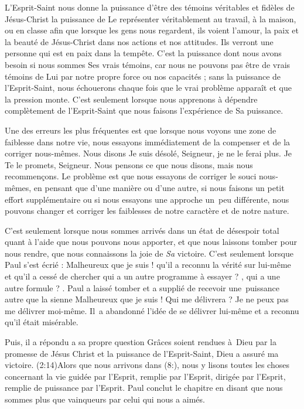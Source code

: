 L'Esprit-Saint nous donne la puissance d'être des témoins véritables
 et fidèles de Jésus-Christ \ocadr la puissance de Le représenter
 véritablement au travail, à la maison, ou en classe \fcadr{}
 afin que lorsque les gens nous regardent, ils voient l'amour,
 la paix et la beauté de Jésus-Christ dans nos actions et nos attitudes.
 Ils verront une personne qui est en paix dans la tempête.
 C'est la puissance dont nous avons besoin si nous sommes Ses vrais témoins,
 car nous ne pouvons pas être de vrais témoins de Lui par notre propre force
 ou nos capacités ; sans la puissance de l'Esprit-Saint, nous échouerons
 chaque fois que le vrai problème apparaît et que la pression monte.
 C'est seulement lorsque nous apprenons à dépendre complètement
 de l'Esprit-Saint que nous faisons l'expérience de Sa puissance.

Une des erreurs les plus fréquentes est que lorsque nous voyons une zone
 de faiblesse dans notre vie, nous essayons immédiatement de la compenser
 et de la corriger nous-mêmes. Nous disons\frcolon{}
 \Og Je suis désolé, Seigneur, je ne le ferai plus.
 Je Te le promets, Seigneur. \Fg{}
 Nous pensons ce que nous disons, mais nous recommençons.
 Le problème est que nous essayons de corriger le souci nous-mêmes,
 en pensant que d'une manière ou d'une autre, si nous faisons un petit effort
 supplémentaire ou si nous essayons une approche un~peu différente,
 nous pouvons changer et corriger les faiblesses de notre caractère
 et de notre nature.

C'est seulement lorsque nous sommes arrivés dans un état de désespoir total
 quant à l'aide que nous pouvons nous apporter, et que nous laissons
 tomber pour nous rendre, que nous connaissons la joie de \emph{Sa} victoire.
 C'est seulement lorsque Paul s'est écrié :
 \Og Malheureux que je suis ! \Fg{} qu'il a reconnu la vérité sur lui-même
 et qu'il a cessé de chercher \Og qui a un autre programme à essayer ? \Fg{},
 \Og qui a une autre formule ? \Fg{}.
 Paul a laissé tomber et a supplié de recevoir une~puissance
 autre que la sienne\frcolon{} \Og Malheureux que je suis ! Qui me délivrera ?
 Je ne peux pas me délivrer moi-même. \Fg{}
 Il~a abandonné l'idée de se délivrer lui-même et a reconnu
 qu'il était misérable.

Puis, il a répondu a sa propre question\frcolon{}
 \Og Grâces soient rendues à~Dieu par la promesse de Jésus Christ
 et la puissance de l'Esprit-Saint, Dieu a assuré ma victoire. \Fg{}
 (2:14)Alors que nous arrivons dans (8:),
 nous y lisons toutes les choses concernant la vie guidée par l'Esprit,
 remplie par l'Esprit, dirigée par l'Esprit, remplie de puissance par l'Esprit.
 Paul conclut le chapitre en disant que nous sommes \Og plus que vainqueurs
 par celui qui nous a aimés. \Fg{}

